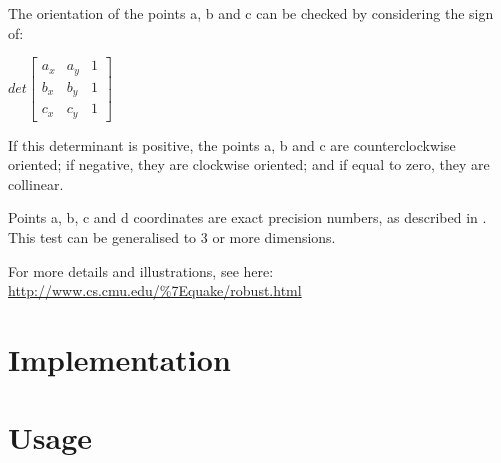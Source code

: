 \documentclass{InsightArticle}
\begin{document}
The orientation of the points a, b and c can be checked by considering the sign
of:

\begin{math}
det
\begin{bmatrix}
a_x & a_y & 1 \\
b_x & b_y & 1 \\
c_x & c_y & 1
\end{bmatrix}
\end{math}

If this determinant is positive, the points a, b and c are counterclockwise
oriented; if negative, they are clockwise oriented; and if equal to zero, they
are collinear.

Points a, b, c and d coordinates are exact precision numbers, as described in
\cite{shewchuk97a}. This test can be generalised to 3 or more dimensions.

For more details and illustrations, see here:
\url{http://www.cs.cmu.edu/%7Equake/robust.html}

\section{Implementation}

\section{Usage}



\end{document}
